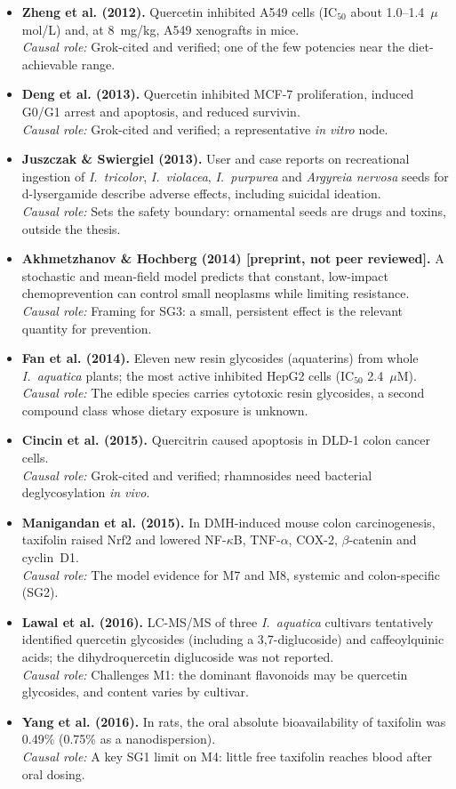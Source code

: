 \documentclass[11pt,a4paper]{article}
\newenvironment{litlist}{\begin{itemize}[leftmargin=2.6em,labelwidth=2.2em,labelsep=0.4em,align=left,itemsep=5pt,topsep=4pt]}{\end{itemize}}
\newcommand{\litentry}[4]{\item[\cite{#1}] \textbf{\color{navy}#2.} #3\\[1pt]
  {\color{teal}\textit{Causal role:}} #4}
\newcommand{\Ia}{\emph{I.~aquatica}}
\newcommand{\prelim}{{\sffamily\scriptsize\color{orange!85!black}[preprint, not peer reviewed]}}
\begin{document}
\begin{litlist}
\litentry{zheng2012}{Zheng et al. (2012)}{Quercetin inhibited A549 cells (IC$_{50}$ about 1.0--1.4~$\mu$mol/L) and, at 8~mg/kg, A549 xenografts in mice.}{Grok-cited and verified; one of the few potencies near the diet-achievable range.}

\litentry{deng2013}{Deng et al. (2013)}{Quercetin inhibited MCF-7 proliferation, induced G0/G1 arrest and apoptosis, and reduced survivin.}{Grok-cited and verified; a representative \emph{in vitro} node.}

\litentry{juszczak2013}{Juszczak \& Swiergiel (2013)}{User and case reports on recreational ingestion of \emph{I.~tricolor}, \emph{I.~violacea}, \emph{I.~purpurea} and \emph{Argyreia nervosa} seeds for d-lysergamide describe adverse effects, including suicidal ideation.}{Sets the safety boundary: ornamental seeds are drugs and toxins, outside the thesis.}

\litentry{akhmetzhanov2014}{Akhmetzhanov \& Hochberg (2014) \prelim}{A stochastic and mean-field model predicts that constant, low-impact chemoprevention can control small neoplasms while limiting resistance.}{Framing for SG3: a small, persistent effect is the relevant quantity for prevention.}

\litentry{fan2014}{Fan et al. (2014)}{Eleven new resin glycosides (aquaterins) from whole \Ia{} plants; the most active inhibited HepG2 cells (IC$_{50}$ 2.4~$\mu$M).}{The edible species carries cytotoxic resin glycosides, a second compound class whose dietary exposure is unknown.}

\litentry{cincin2015}{Cincin et al. (2015)}{Quercitrin caused apoptosis in DLD-1 colon cancer cells.}{Grok-cited and verified; rhamnosides need bacterial deglycosylation \emph{in vivo}.}

\litentry{manigandan2015}{Manigandan et al. (2015)}{In DMH-induced mouse colon carcinogenesis, taxifolin raised Nrf2 and lowered NF-$\kappa$B, TNF-$\alpha$, COX-2, $\beta$-catenin and cyclin~D1.}{The model evidence for M7 and M8, systemic and colon-specific (SG2).}

\litentry{lawal2016}{Lawal et al. (2016)}{LC-MS/MS of three \Ia{} cultivars tentatively identified quercetin glycosides (including a 3,7-diglucoside) and caffeoylquinic acids; the dihydroquercetin diglucoside was not reported.}{Challenges M1: the dominant flavonoids may be quercetin glycosides, and content varies by cultivar.}

\litentry{yang2016}{Yang et al. (2016)}{In rats, the oral absolute bioavailability of taxifolin was 0.49\% (0.75\% as a nanodispersion).}{A key SG1 limit on M4: little free taxifolin reaches blood after oral dosing.}
\end{litlist}
\end{document}
